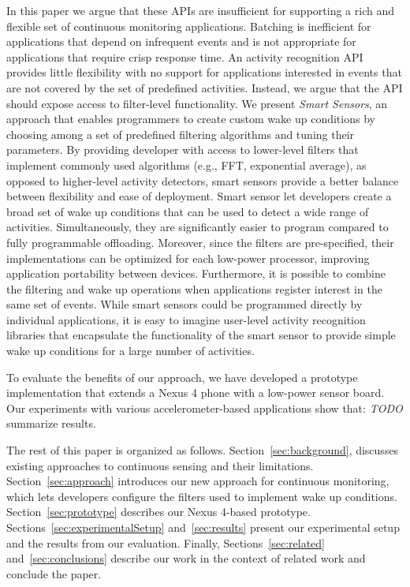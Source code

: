 In this paper we argue that these APIs are insufficient for supporting
a rich and flexible set of continuous monitoring applications.
Batching is inefficient for applications that depend on infrequent
events and is not appropriate for applications that require crisp
response time.  An activity recognition API provides little
flexibility with no support for applications interested in events that
are not covered by the set of predefined activities.  Instead, we
argue that the API should expose access to filter-level functionality.
We present {\em Smart Sensors}, an approach that enables programmers
to create custom wake up conditions by choosing among a set of
predefined filtering algorithms and tuning their parameters.  By
providing developer with access to lower-level filters that implement
commonly used algorithms (e.g., FFT, exponential average), as opposed
to higher-level activity detectors, smart sensors provide a better
balance between flexibility and ease of deployment.  Smart sensor let
developers create a broad set of wake up conditions that can be used
to detect a wide range of activities.  Simultaneously, they are
significantly easier to program compared to fully programmable
offloading.  Moreover, since the filters are pre-specified, their
implementations can be optimized for each low-power processor,
improving application portability between devices.  Furthermore, it is
possible to combine the filtering and wake up operations when
applications register interest in the same set of events.  While smart
sensors could be programmed directly by individual applications, it is
easy to imagine user-level activity recognition libraries that
encapsulate the functionality of the smart sensor to provide simple
wake up conditions for a large number of activities.

To evaluate the benefits of our approach, we have developed a prototype
implementation that extends a Nexus 4 phone with a low-power sensor
board.  Our experiments with various accelerometer-based applications
show that: {\em TODO} summarize results.

The rest of this paper is organized as follows.
Section~\ref{sec:background}, discusses existing approaches to
continuous sensing and their limitations.  Section~\ref{sec:approach}
introduces our new approach for continuous monitoring, which lets
developers configure the filters used to implement wake up conditions.
Section~\ref{sec:prototype} describes our Nexus 4-based prototype.
Sections~\ref{sec:experimentalSetup} and~\ref{sec:results} present our
experimental setup and the results from our evaluation.  Finally,
Sections~\ref{sec:related} and~\ref{sec:conclusions} describe our work
in the context of related work and conclude the paper.

